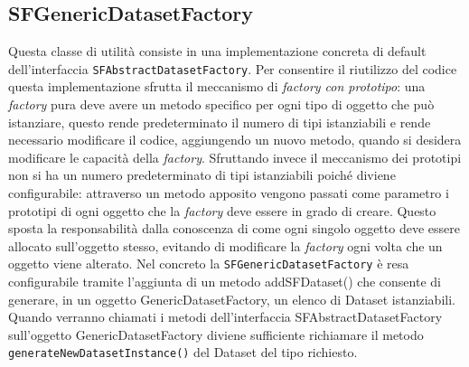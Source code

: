 \subsection{SFGenericDatasetFactory}
\label{sub:sfgenericdatasetfactory}
Questa classe di utilit\`a consiste in una implementazione concreta di default dell'interfaccia \texttt{SFAbstractDatasetFactory}.
Per consentire il riutilizzo del codice questa implementazione sfrutta il meccanismo di \textit{factory con prototipo}: una \textit{factory} pura deve avere un metodo specifico per ogni tipo di oggetto che pu\`o istanziare, questo rende predeterminato il numero di tipi istanziabili e rende necessario modificare il codice, aggiungendo un nuovo metodo, quando si desidera modificare le capacit\`a della \textit{factory}.
Sfruttando invece il meccanismo dei prototipi non si ha un numero predeterminato di tipi istanziabili poich\'e diviene configurabile: attraverso un metodo apposito vengono passati come parametro i prototipi di ogni oggetto che la \textit{factory} deve essere in grado di creare.
Questo sposta la responsabilit\`a dalla conoscenza di come ogni singolo oggetto deve essere allocato sull'oggetto stesso, evitando di modificare la \textit{factory} ogni volta che un oggetto viene alterato.
Nel concreto la \texttt{SFGenericDatasetFactory} \`e resa configurabile tramite l'aggiunta di un metodo addSFDataset() che consente di generare, in un oggetto GenericDatasetFactory, un elenco di Dataset istanziabili.
Quando verranno chiamati i metodi dell'interfaccia SFAbstractDatasetFactory sull'oggetto GenericDatasetFactory diviene sufficiente richiamare il metodo \texttt{generateNewDatasetInstance()} del Dataset del tipo richiesto.